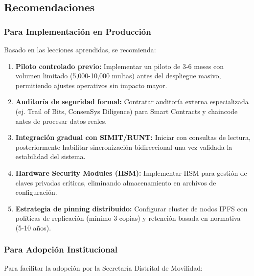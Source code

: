 \subsection{Recomendaciones}

\subsubsection{Para Implementación en Producción}

Basado en las lecciones aprendidas, se recomienda:

\begin{enumerate}
    \item \textbf{Piloto controlado previo:} Implementar un piloto de 3-6 meses con volumen limitado (5,000-10,000 multas) antes del despliegue masivo, permitiendo ajustes operativos sin impacto mayor.
    
    \item \textbf{Auditoría de seguridad formal:} Contratar auditoría externa especializada (ej. Trail of Bits, ConsenSys Diligence) para Smart Contracts y chaincode antes de procesar datos reales.
    
    \item \textbf{Integración gradual con SIMIT/RUNT:} Iniciar con consultas de lectura, posteriormente habilitar sincronización bidireccional una vez validada la estabilidad del sistema.
    
    \item \textbf{Hardware Security Modules (HSM):} Implementar HSM para gestión de claves privadas críticas, eliminando almacenamiento en archivos de configuración.
    
    \item \textbf{Estrategia de pinning distribuido:} Configurar cluster de nodos IPFS con políticas de replicación (mínimo 3 copias) y retención basada en normativa (5-10 años).
\end{enumerate}

\subsubsection{Para Adopción Institucional}

Para facilitar la adopción por la Secretaría Distrital de Movilidad:

